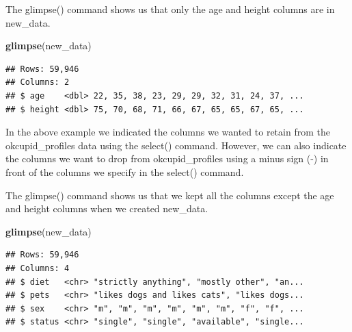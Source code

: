 \documentclass[
]{krantz}
\makeatletter
\newenvironment{Shaded}{\begin{snugshade}}{\end{snugshade}}
\newcommand{\KeywordTok}[1]{\textcolor[rgb]{0.27,0.27,0.27}{\textbf{#1}}}
\newcommand{\NormalTok}[1]{#1}
\newcommand{\OperatorTok}[1]{\textcolor[rgb]{0.43,0.43,0.43}{\textbf{#1}}}
\newcommand{\StringTok}[1]{\textcolor[rgb]{0.5,0.5,0.5}{#1}}
\newenvironment{kframe}{%
\medskip{}
\setlength{\fboxsep}{.8em}
 \def\at@end@of@kframe{}%
 \ifinner\ifhmode%
  \def\at@end@of@kframe{\end{minipage}}%
  \begin{minipage}{\columnwidth}%
 \fi\fi%
 \def\FrameCommand##1{\hskip\@totalleftmargin \hskip-\fboxsep
 \colorbox{shadecolor}{##1}\hskip-\fboxsep
     \hskip-\linewidth \hskip-\@totalleftmargin \hskip\columnwidth}%
 \MakeFramed {\advance\hsize-\width
   \@totalleftmargin\z@ \linewidth\hsize
   \@setminipage}}%
 {\par\unskip\endMakeFramed%
 \at@end@of@kframe}
\renewenvironment{Shaded}{\begin{kframe}}{\end{kframe}}
\makeatother
\begin{document}
\begin{Shaded}
\end{Shaded}

The glimpse() command shows us that only the age and height columns are in new\_data.

\begin{Shaded}
\begin{Highlighting}[]
\KeywordTok{glimpse}\NormalTok{(new_data)}
\end{Highlighting}
\end{Shaded}

\begin{verbatim}
## Rows: 59,946
## Columns: 2
## $ age    <dbl> 22, 35, 38, 23, 29, 29, 32, 31, 24, 37, ...
## $ height <dbl> 75, 70, 68, 71, 66, 67, 65, 65, 67, 65, ...
\end{verbatim}

In the above example we indicated the columns we wanted to retain from the okcupid\_profiles data using the select() command. However, we can also indicate the columns we want to drop from okcupid\_profiles using a minus sign (-) in front of the columns we specify in the select() command.

\begin{Shaded}
\end{Shaded}

The glimpse() command shows us that we kept all the columns except the age and height columns when we created new\_data.

\begin{Shaded}
\begin{Highlighting}[]
\KeywordTok{glimpse}\NormalTok{(new_data)}
\end{Highlighting}
\end{Shaded}

\begin{verbatim}
## Rows: 59,946
## Columns: 4
## $ diet   <chr> "strictly anything", "mostly other", "an...
## $ pets   <chr> "likes dogs and likes cats", "likes dogs...
## $ sex    <chr> "m", "m", "m", "m", "m", "m", "f", "f", ...
## $ status <chr> "single", "single", "available", "single...
\end{verbatim}
\end{document}
